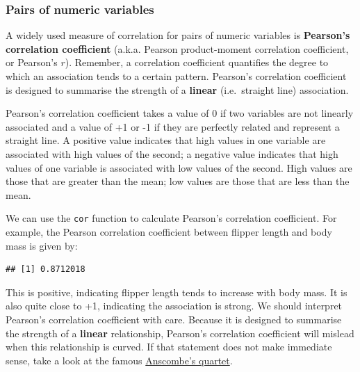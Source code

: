\documentclass[
]{book}
\newenvironment{Shaded}{\begin{snugshade}}{\end{snugshade}}
\newcommand{\AttributeTok}[1]{\textcolor[rgb]{0.77,0.63,0.00}{#1}}
\newcommand{\FunctionTok}[1]{\textcolor[rgb]{0.00,0.00,0.00}{#1}}
\newcommand{\NormalTok}[1]{#1}
\newcommand{\SpecialCharTok}[1]{\textcolor[rgb]{0.00,0.00,0.00}{#1}}
\newcommand{\StringTok}[1]{\textcolor[rgb]{0.31,0.60,0.02}{#1}}
\begin{document}
\hypertarget{pairs-of-numeric-variables}{%
\subsubsection{Pairs of numeric variables}\label{pairs-of-numeric-variables}}

A widely used measure of correlation for pairs of numeric variables is \textbf{Pearson's correlation coefficient} (a.k.a. Pearson product-moment correlation coefficient, or Pearson's \(r\)). Remember, a correlation coefficient quantifies the degree to which an association tends to a certain pattern. Pearson's correlation coefficient is designed to summarise the strength of a \textbf{linear} (i.e.~straight line) association.

Pearson's correlation coefficient takes a value of 0 if two variables are not linearly associated and a value of +1 or -1 if they are perfectly related and represent a straight line. A positive value indicates that high values in one variable are associated with high values of the second; a negative value indicates that high values of one variable is associated with low values of the second. High values are those that are greater than the mean; low values are those that are less than the mean.

We can use the \texttt{cor} function to calculate Pearson's correlation coefficient. For example, the Pearson correlation coefficient between flipper length and body mass is given by:

\begin{Shaded}
\end{Shaded}

\begin{verbatim}
## [1] 0.8712018
\end{verbatim}

This is positive, indicating flipper length tends to increase with body mass. It is also quite close to +1, indicating the association is strong. We should interpret Pearson's correlation coefficient with care. Because it is designed to summarise the strength of a \textbf{linear} relationship, Pearson's correlation coefficient will mislead when this relationship is curved. If that statement does not make immediate sense, take a look at the famous \href{https://en.wikipedia.org/wiki/Anscombe\%27s_quartet}{Anscombe's quartet}.
\end{document}
